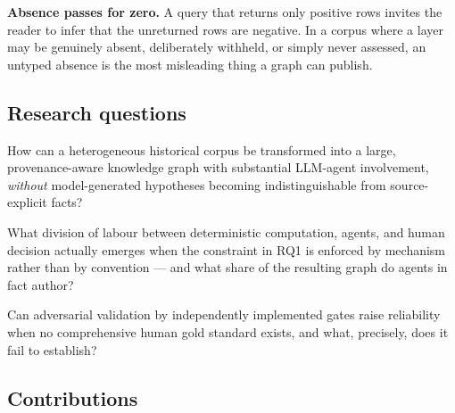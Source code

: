 \textbf{Absence passes for zero.} A query that returns only positive rows invites the
reader to infer that the unreturned rows are negative. In a corpus where a layer may
be genuinely absent, deliberately withheld, or simply never assessed, an untyped
absence is the most misleading thing a graph can publish.

\subsection{Research questions}

\begin{description}[leftmargin=1.9em,itemsep=2pt,topsep=3pt]
  \item[RQ1] How can a heterogeneous historical corpus be transformed into a large,
  provenance-aware knowledge graph with substantial \mbox{LLM}-agent involvement,
  \emph{without} model-generated hypotheses becoming indistinguishable from
  source-explicit facts?
  \item[RQ2] What division of labour between deterministic computation, agents, and
  human decision actually emerges when the constraint in RQ1 is enforced by mechanism
  rather than by convention --- and what share of the resulting graph do agents in
  fact author?
  \item[RQ3] Can adversarial validation by independently implemented gates raise
  reliability when no comprehensive human gold standard exists, and what, precisely,
  does it fail to establish?
\end{description}

\subsection{Contributions}


